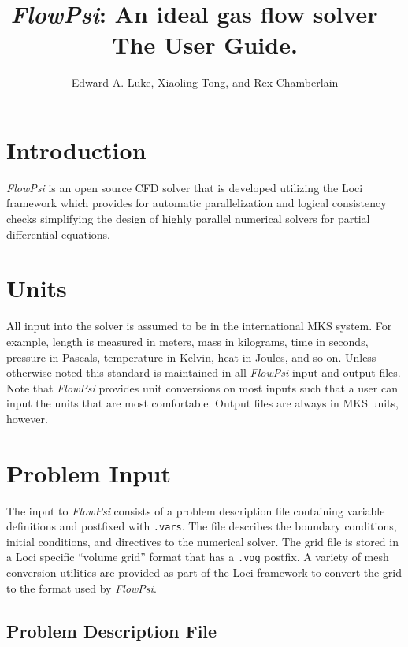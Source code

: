 \documentclass{article}
\begin{document}
\title{{\em FlowPsi}: An ideal gas flow solver -- The User Guide.}

\author{ Edward A. Luke, Xiaoling Tong, and Rex Chamberlain}

\maketitle
\section{Introduction}

{\em FlowPsi } is an open source CFD solver that is developed
utilizing the Loci framework\cite{Luke.2005,Zhang.2009} which provides
for automatic parallelization and logical consistency checks
simplifying the design of highly parallel numerical solvers for
partial differential equations.

\section{Units}

All input into the solver is assumed to be in the international MKS
system.  For example, length is measured in meters, mass in kilograms,
time in seconds, pressure in Pascals, temperature in Kelvin, heat in
Joules, and so on.  Unless otherwise noted this standard is maintained
in all {\em FlowPsi} input and output files.  Note that {\em FlowPsi}
provides unit conversions on most inputs such that a user can input
the units that are most comfortable.  Output files are always in MKS
units, however.

\section{Problem Input}

The input to {\em FlowPsi} consists of a problem description file containing
variable definitions and postfixed with {\tt .vars}. The file
describes the boundary conditions, initial conditions, and directives
to the numerical solver. The grid file is stored in a Loci specific
``volume grid'' format that has a {\tt .vog} postfix.  A variety of
mesh conversion utilities are provided as part of the Loci framework
to convert the grid to the format used by {\em FlowPsi}.  

\subsection{Problem Description File}
\label{prob_description_file}
\end{document}
